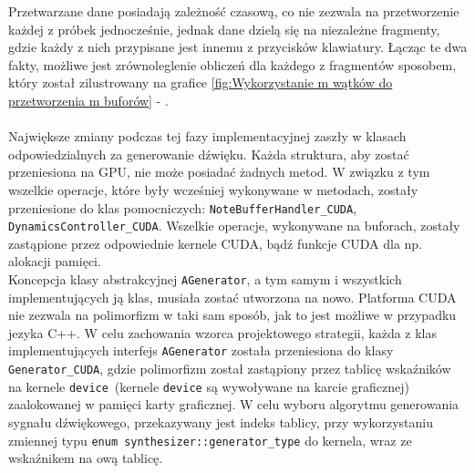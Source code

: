 Przetwarzane dane posiadają zależność czasową, co nie zezwala na przetworzenie każdej z próbek jednocześnie, jednak dane dzielą się na niezależne fragmenty, gdzie każdy z nich przypisane jest innemu z przycisków klawiatury. Łącząc te dwa fakty, możliwe jest zrównoleglenie obliczeń dla każdego z fragmentów sposobem, który został zilustrowany na grafice \ref{fig:Wykorzystanie m wątków do przetworzenia m buforów} - .
\\\\
Największe zmiany podczas tej fazy implementacyjnej zaszły w klasach odpowiedzialnych za generowanie dźwięku. Każda struktura, aby zostać przeniesiona na GPU, nie może posiadać żadnych metod. W związku z tym wszelkie operacje, które były wcześniej wykonywane w metodach, zostały przeniesione do klas pomocniczych: \texttt{NoteBufferHandler\_CUDA}, \texttt{DynamicsController\_CUDA}. Wszelkie operacje, wykonywane na buforach, zostały zastąpione przez odpowiednie kernele CUDA\cite{bib:CUDA}, bądź funkcje CUDA\cite{bib:CUDA} dla np. alokacji pamięci. 
\\
Koncepcja klasy abstrakcyjnej \texttt{AGenerator}, a tym samym i wszystkich implementujących ją klas, musiała zostać utworzona na nowo. Platforma CUDA\cite{bib:CUDA} nie zezwala na polimorfizm w taki sam sposób, jak to jest możliwe w przypadku jezyka C++. W celu zachowania wzorca projektowego strategii\cite{bib:DesignPatterns}, każda z klas implementujących interfejs \texttt{AGenerator} została przeniesiona do klasy \texttt{Generator\_CUDA}, gdzie polimorfizm został zastąpiony przez tablicę wskaźników na kernele \texttt{device}\ (kernele \texttt{device} są wywoływane na karcie graficznej) zaalokowanej w pamięci karty graficznej. W celu wyboru algorytmu generowania sygnału dźwiękowego, przekazywany jest indeks tablicy, przy wykorzystaniu zmiennej typu \texttt{enum synthesizer::generator\_type} do kernela, wraz ze wskaźnikem na ową tablicę.
\\
